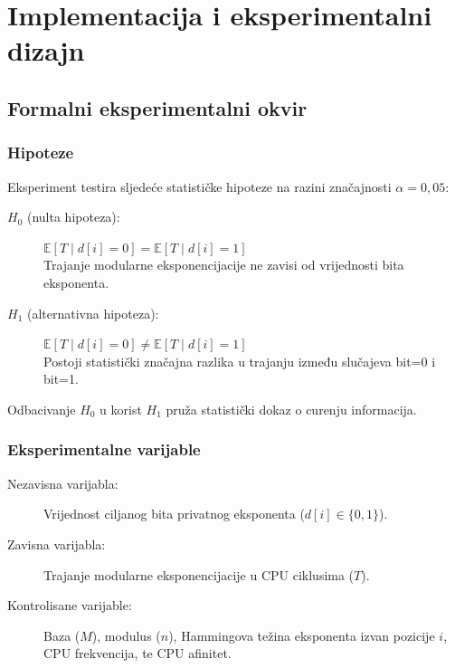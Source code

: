 
\chapter{Implementacija i eksperimentalni dizajn}
\label{ch:implementacija}

\section{Formalni eksperimentalni okvir}

\subsection{Hipoteze}

Eksperiment testira sljedeće statističke hipoteze na razini značajnosti $\alpha = 0{,}05$:

\begin{description}
\item[$H_0$ (nulta hipoteza):] $\mathbb{E}[T \mid d[i]=0] = \mathbb{E}[T \mid d[i]=1]$ \\
Trajanje modularne eksponencijacije ne zavisi od vrijednosti bita eksponenta.
\item[$H_1$ (alternativna hipoteza):] $\mathbb{E}[T \mid d[i]=0] \neq \mathbb{E}[T \mid d[i]=1]$ \\
Postoji statistički značajna razlika u trajanju između slučajeva bit=0 i bit=1.
\end{description}

Odbacivanje $H_0$ u korist $H_1$ pruža statistički dokaz o curenju informacija.

\subsection{Eksperimentalne varijable}

\begin{description}
\item[Nezavisna varijabla:] Vrijednost ciljanog bita privatnog eksponenta ($d[i] \in \{0, 1\}$).
\item[Zavisna varijabla:] Trajanje modularne eksponencijacije u CPU ciklusima ($T$).
\item[Kontrolisane varijable:] Baza ($M$), modulus ($n$), Hammingova težina eksponenta izvan pozicije $i$, CPU frekvencija, te CPU afinitet.
\end{description}

